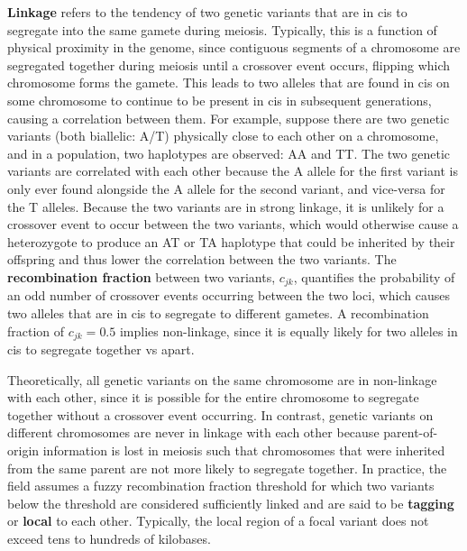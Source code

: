 \documentclass[12pt]{article}
\begin{document}
\textbf{Linkage} refers to the tendency of two genetic variants that are in cis to segregate into the same gamete during meiosis.
Typically, this is a function of physical proximity in the genome, since contiguous segments of a chromosome are segregated together during meiosis until a crossover event occurs, flipping which chromosome forms the gamete.
This leads to two alleles that are found in cis on some chromosome to continue to be present in cis in subsequent generations, causing a correlation between them.
For example, suppose there are two genetic variants (both biallelic: A/T) physically close to each other on a chromosome, and in a population, two haplotypes are observed: AA and TT.
The two genetic variants are correlated with each other because the A allele for the first variant is only ever found alongside the A allele for the second variant, and vice-versa for the T alleles.
Because the two variants are in strong linkage, it is unlikely for a crossover event to occur between the two variants, which would otherwise cause a heterozygote to produce an AT or TA haplotype that could be inherited by their offspring and thus lower the correlation between the two variants.
The \textbf{recombination fraction} between two variants, $c_{jk}$, quantifies the probability of an odd number of crossover events occurring between the two loci, which causes two alleles that are in cis to segregate to different gametes.
A recombination fraction of $c_{jk} = 0.5$ implies non-linkage, since it is equally likely for two alleles in cis to segregate together vs apart.

Theoretically, all genetic variants on the same chromosome are in non-linkage with each other, since it is possible for the entire chromosome to segregate together without a crossover event occurring.
In contrast, genetic variants on different chromosomes are never in linkage with each other because parent-of-origin information is lost in meiosis such that chromosomes that were inherited from the same parent are not more likely to segregate together.
In practice, the field assumes a fuzzy recombination fraction threshold for which two variants below the threshold are considered sufficiently linked and are said to be \textbf{tagging} or \textbf{local} to each other.
Typically, the local region of a focal variant does not exceed tens to hundreds of kilobases.\citep{Pritchard2001AJHG}
\end{document}
